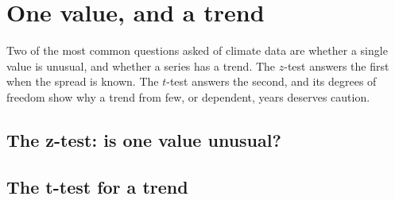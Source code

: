 \chapter{One value, and a trend}\label{ch:one}
Two of the most common questions asked of climate data are whether a single value is unusual, and whether a series has a trend. The $z$-test answers the first when the spread is known. The $t$-test answers the second, and its degrees of freedom show why a trend from few, or dependent, years deserves caution.

\section{The z-test: is one value unusual?}

\section{The t-test for a trend}

